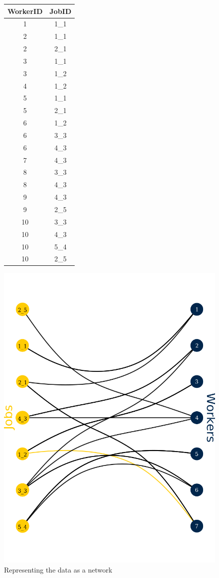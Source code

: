 \documentclass[12pt]{article}
\theoremstyle{definition}
\theoremstyle{plain}
\begin{document}
\begin{figure}
	\caption{Representing the data as a network}
	\begin{minipage}{.5\textwidth}
		\centering
		\begin{tabular}{cc}
			\toprule
			WorkerID	& JobID	\\
			\midrule
			1	& 1\_1	\\
			2	& 1\_1	\\
			2	& 2\_1	\\
			3	& 1\_1	\\
			3	& 1\_2	\\
			4	& 1\_2	\\
			5	& 1\_1	\\
			5	& 2\_1	\\
			6	& 1\_2	\\
			6	& 3\_3	\\
			6	& 4\_3	\\
			7	& 4\_3	\\
			8	& 3\_3	\\
			8	& 4\_3	\\
			9	& 4\_3	\\
			9	& 2\_5	\\
			10	& 3\_3	\\
			10	& 4\_3	\\
			10	& 5\_4	\\
			10	& 2\_5	\\
			\bottomrule
		\end{tabular}
	\end{minipage}
	\begin{minipage}{.5\textwidth}
		\centering
		\includegraphics[width = \textwidth]{intro_fig_v2_21.png} 

\end{minipage}
\end{figure}
\end{document}
